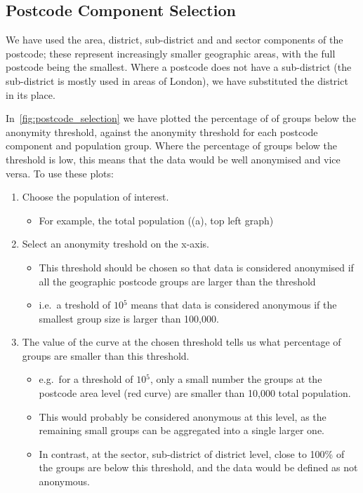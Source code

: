 \documentclass[12pt, a4paper]{article}
\begin{document}
\subsection{Postcode Component Selection}

We have used the area, district, sub-district and and sector components of the postcode; these represent increasingly smaller geographic areas, with the full postcode being the smallest. Where a postcode does not have a sub-district (the sub-district is mostly used in areas of London), we have substituted the district in its place.

In~\cref{fig:postcode_selection} we have plotted the percentage of of groups below the anonymity threshold, against the anonymity threshold for each postcode component and population group. Where the percentage of groups below the threshold is low, this means that the data would be well anonymised and vice versa. To use these plots:
\begin{enumerate}
\item Choose the population of interest.
\begin{itemize}
\item For example, the total population ((a), top left graph)
\end{itemize}
\item Select an anonymity treshold on the x-axis. 
\begin{itemize}
\item This threshold should be chosen so that data is considered anonymised if all the geographic postcode groups are larger than the threshold
\item i.e.\ a treshold of $10{^5}$ means that data is considered anonymous if the smallest group size is larger than 100,000.
\end{itemize}
\item The value of the curve at the chosen threshold tells us what percentage of groups are smaller than this threshold.
\begin{itemize}
\item e.g.\ for a threshold of $10{^5}$, only a small number the groups at the postcode area level (red curve) are smaller than 10,000 total population.
\item This would probably be considered anonymous at this level, as the remaining small groups can be aggregated into a single larger one.
\item In contrast, at the sector, sub-district of district level, close to 100\% of the groups are below this threshold, and the data would be defined as not anonymous.
\end{itemize}
\end{enumerate}
\end{document}
